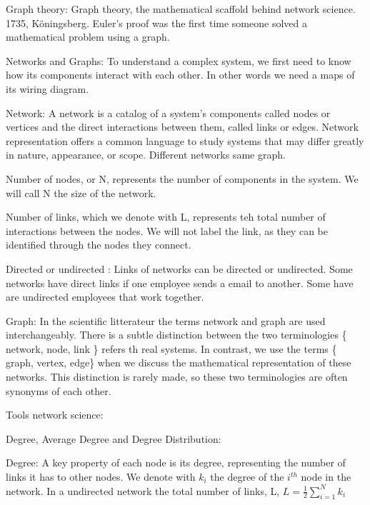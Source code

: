 
Graph theory: 
    Graph theory, the mathematical scaffold behind network science. 1735, Köningsberg. Euler's proof was the first time someone solved a mathematical problem using a graph. 

Networks and Graphs: 
    To understand a complex system, we first need to know how its components interact with each other.  In other words we need a maps of its wiring diagram. 

Network: 
    A network is a catalog of a system's components called nodes or vertices and the direct interactions between them, called links or edges. Network representation offers a common language to study systems that may differ greatly in nature, appearance, or scope. Different networks same graph. 
    
    Number of nodes, or N, represents the number of components in the system. We will call N the size of the network.
    
    Number of links, which we denote with L, represents teh total number of interactions between the nodes. We will not label the link, as they can be identified through the nodes they connect. 

Directed or undirected : 
    Links of networks can be directed or undirected. Some networks have direct links if one employee sends a email to another. Some have are undirected employees that work together. 

Graph: 
    In the scientific litterateur the terms network and graph are used interchangeably. There is a subtle distinction between the two terminologies \{ network, node, link \} refers th real systems. In contrast, we use the terms \{ graph, vertex, edge\} when we discuss the mathematical representation of these networks. This distinction is rarely made, so these two terminologies are often synonyms of each other.

Tools network science: 

Degree, Average Degree and Degree Distribution: 

Degree: 
    A key property of each node is its degree, representing the number of links it has to other nodes. 
        We denote with $k_{i}$ the degree of the $i^{th}$ node in the network.
    In a undirected network the total number of links, L, 
    $L=  \frac{1}{2} \sum_{i=1}^{N}k_i$
    


